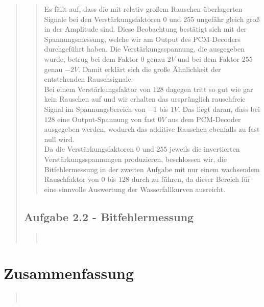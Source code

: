 \begin{quote}
\begin{quote}
        Es fällt auf, dass die mit relativ großem Rauschen überlagerten Signale
        bei den Verstärkungsfaktoren $0$ und $255$ ungefähr gleich groß in der Amplitude
        sind. Diese Beobachtung bestätigt sich mit der Spannungsmessung, welche
        wir am Output des PCM-Decoders durchgeführt haben. Die
        Verstärkungsspannung, die ausgegeben wurde, betrug bei dem Faktor $0$
        genau $2V$ und bei dem Faktor $255$ genau $-2V$. Damit erklärt sich die
        große Ähnlichkeit der entstehenden Rauschsignale.\\
        Bei einem Verstärkungsfaktor von $128$ dagegen tritt so gut wie gar kein
        Rauschen auf und wir erhalten das ursprünglich rauschfreie Signal im
        Spannungsbereich von $-1$ bis $1V$. Das liegt daran, dass bei $128$ eine
        Output-Spannung von fast $0V$ aus dem PCM-Decoder ausgegeben werden,
        wodurch das additive Rauschen ebenfalls zu fast null wird.\\
        Da die Verstärkungsfaktoren $0$ und $255$ jeweils die invertierten
        Verstärkungsspannungen produzieren, beschlossen wir, die
        Bitfehlermessung in der zweiten Aufgabe mit nur einem wachsendem
        Rauschfaktor von $0$ bis $128$ durch zu führen, da dieser Bereich für
        eine sinnvolle Auswertung der Wasserfallkurven ausreicht.
        
        
        \end{quote}  %
    
    \subsection{Aufgabe 2.2 - Bitfehlermessung}
    \begin{quote}
         \\
    \end{quote}  %
            
\end{quote}%

    
\section{Zusammenfassung}
\begin{quote}

     \\
\end{quote}%
         

